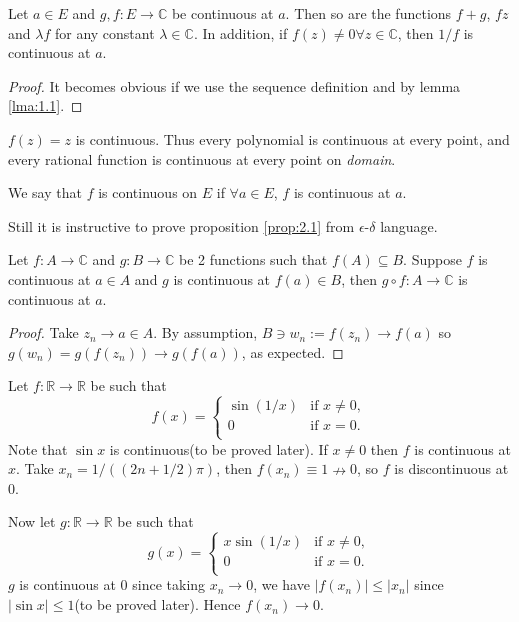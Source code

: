 \begin{proposition}\label{prop:2.1}
    Let $a\in E$ and $ g,f:E\to \mathbb{C} $ be continuous at $a$. Then so are the functions $ f+g $, $fz$ and $\lambda f$ for any constant $ \lambda\in \mathbb{C} $. In addition, if $f(z)\neq 0 \forall z\in \mathbb{C} $, then $ 1/f $ is continuous at $a$.
\end{proposition}
\begin{proof}
    It becomes obvious if we use the sequence definition and by lemma \ref{lma:1.1}.
\end{proof}

\begin{example}
    $ f(z)=z $ is continuous. Thus every polynomial is continuous at every point, and every rational function is continuous at every point on \textit{domain}.
\end{example}

\begin{note}
    We say that $f$ is continuous on $E$ if $ \forall a\in E $, $f$ is continuous at $a$.
\end{note}
\begin{remark}
    Still it is instructive to prove proposition \ref{prop:2.1} from $ \epsilon $-$ \delta $ language.
\end{remark}

\begin{theorem}\label{thm:2.2}
    Let $f:A\to \mathbb{C}$ and $g:B\to \mathbb{C}$ be 2 functions such that $ f(A) \subseteq B $. Suppose $f$ is continuous at $a\in A$ and $g$ is continuous at $f(a)\in B$, then $ g \circ f:A\to \mathbb{C}  $ is continuous at $a$.
\end{theorem}
\begin{proof}
    Take $ z_n\to a\in A $. By assumption, $ B\ni w_n:=f(z_n)\to f(a) $ so $ g(w_n)=g(f(z_n))\to g(f(a)) $, as expected.
\end{proof}

\begin{example}
    Let $ f:\mathbb{R} \to \mathbb{R}  $ be such that
    \[
        f(x) = \begin{cases}
            \sin \left( 1/x \right) & \text{if } x\neq 0, \\
            0                       & \text{if }x=0.      \\
        \end{cases}
    \]
    Note that $ \sin x $ is continuous(to be proved later). If $x\neq 0$ then $f$ is continuous at $x$. Take $ x_n = 1/((2n+1/2)\pi) $, then $ f(x_n)\equiv 1\nrightarrow 0 $, so $f$ is discontinuous at 0.

    Now let $g:\mathbb{R} \to \mathbb{R} $ be such that
    \[
        g(x)=\begin{cases}
            x\sin \left( 1/x \right) & \text{if } x\neq 0, \\
            0                        & \text{if }x=0.      \\
        \end{cases}
    \]
    $g$ is continuous at 0 since taking $ x_n\to 0 $, we have $ |f(x_n)|\le |x_n| $ since $ |\sin x|\le 1 $(to be proved later). Hence $ f(x_n)\to 0 $.
\end{example}

